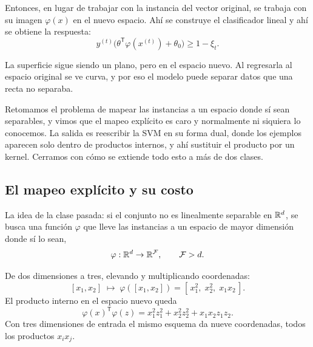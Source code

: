 \documentclass[11pt,letterpaper]{article}
\begin{document}
Entonces, en lugar de trabajar con la instancia del vector original,
se trabaja con su imagen $\varphi(x)$ en el nuevo espacio. Ahí se
construye el clasificador lineal y ahí se obtiene la respuesta:
\[
    y^{(t)} \big(\theta^{\mathsf{T}} \varphi(x^{(t)}) + \theta_0\big)
    \geq 1 - \xi_t .
\]

\begin{idea}
  La superficie sigue siendo un plano, pero en el espacio nuevo. Al
  regresarla al espacio original se ve curva, y por eso el modelo
  puede separar datos que una recta no separaba.
\end{idea}

\newpage



\begin{quick_sum}
    Retomamos el problema de mapear las instancias a un espacio donde
    sí sean separables, y vimos que el mapeo explícito es caro y
    normalmente ni siquiera lo conocemos. La salida es reescribir la
    SVM en su forma dual, donde los ejemplos aparecen solo dentro de
    productos internos, y ahí sustituir el producto por un kernel.
    Cerramos con cómo se extiende todo esto a más de dos clases.
\end{quick_sum}

\subsection*{El mapeo explícito y su costo}

La idea de la clase pasada: si el conjunto no es linealmente separable
en $\mathbb{R}^d$, se busca una función $\varphi$ que lleve las instancias a un
espacio de mayor dimensión donde sí lo sean,
\[
    \varphi : \mathbb{R}^{d} \to \mathbb{R}^{\mathcal{F}} ,
    \qquad \mathcal{F} > d .
\]

\begin{ejemplo}
  De dos dimensiones a tres, elevando y multiplicando coordenadas:
  \[
      [x_1, x_2] \;\longmapsto\;
      \varphi([x_1, x_2]) = [\,x_1^{2},\; x_2^{2},\; x_1 x_2\,] .
  \]
  El producto interno en el espacio nuevo queda
  \[
      \varphi(x)^{\mathsf{T}} \varphi(z) =
      x_1^{2} z_1^{2} + x_2^{2} z_2^{2} + x_1 x_2 z_1 z_2 .
  \]
  Con tres dimensiones de entrada el mismo esquema da nueve
  coordenadas, todos los productos $x_i x_j$.
\end{ejemplo}
\end{document}
